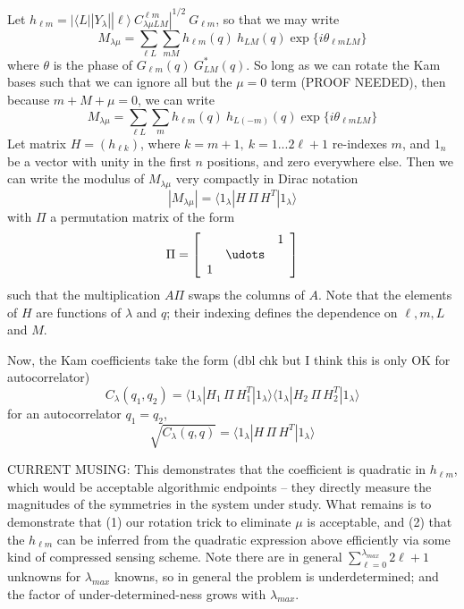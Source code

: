 \documentclass[aps,prl,preprint,groupedaddress]{revtex4-1}
\begin{document}
Let $h_{\ell m} = | \langle L || Y_\lambda || \ell \rangle \> C^{\ell m}_{\lambda \mu LM} |^{1/2}  \> G_{\ell m}$, so that we may write
\[
M_{\lambda \mu} = \sum_{\ell L} \sum_{m M} h_{\ell m}(q) \> h_{L M} (q)
\exp \big\{ i \theta_{\ell m L M} \big\}
\]
where $\theta$ is the phase of $G_{\ell m}(q) \> G_{L M}^* (q)$. So long as we can rotate the Kam bases such that we can ignore all but the $\mu = 0$ term (PROOF NEEDED), then because $m + M + \mu = 0$, we can write
\[
M_{\lambda \mu} = \sum_{\ell L} \sum_{m} h_{\ell m}(q) \> h_{L (-m)} (q)
\exp \big\{ i \theta_{\ell m L M} \big\}
\]
Let matrix $H = (h_{\ell k})$, where $k = m + 1, \ k = 1... 2\ell+1$ re-indexes $m$, and $1_n$ be a vector with unity in the first $n$ positions, and zero everywhere else. Then we can write the modulus of $M_{\lambda \mu}$ very compactly in Dirac notation
\[
| M_{\lambda \mu} | = \langle 1_\lambda | H \, \Pi \, H^T | 1_\lambda \rangle 
\]
with $\Pi$ a permutation matrix of the form
\[
\Pi = \left[ \begin{array}{ccc}
 &  &  1\\
 & \udots  & \\
1 &  &  \\
\end{array} \right]
\]
such that the multiplication $A \Pi$ swaps the columns of $A$. Note that the elements of $H$ are functions of $\lambda$ and $q$; their indexing defines the dependence on $\ell, m, L$ and $M$.

Now, the Kam coefficients take the form (dbl chk but I think this is only OK for autocorrelator)
\[
C_\lambda (q_1, q_2) =
\langle 1_\lambda | H_1 \, \Pi \, H_1^T | 1_\lambda \rangle 
\langle 1_\lambda | H_2 \, \Pi \, H_2^T | 1_\lambda \rangle 
\]
for an autocorrelator $q_1 = q_2$,
\[
\sqrt{C_\lambda (q, q)} =
\langle 1_\lambda | H \, \Pi \, H^T  | 1_\lambda \rangle 
\]

CURRENT MUSING: This demonstrates that the coefficient is quadratic in $h_{\ell m}$, which would be acceptable algorithmic endpoints -- they directly measure the magnitudes of the symmetries in the system under study. What remains is to demonstrate that (1) our rotation trick to eliminate $\mu$ is acceptable, and (2) that the $h_{\ell m}$ can be inferred from the quadratic expression above efficiently via some kind of compressed sensing scheme. Note there are in general $\sum_{\ell = 0}^{\lambda_{max}} 2 \ell + 1$ unknowns for $\lambda_{max}$ knowns, so in general the problem is underdetermined; and the factor of under-determined-ness grows with $\lambda_{max}$.
\end{document}

